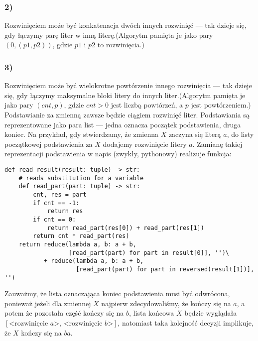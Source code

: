\documentclass[leqno, 12pt]{article}
\begin{document}
\subsubsection*{2)}
Rozwinięciem może być konkatenacja dwóch innych rozwinięć --- tak dzieje się, gdy łączymy parę liter w inną literę.\newline (Algorytm pamięta je jako pary $(0, (p1, p2))$, gdzie $p1$ i $p2$ to rozwinięcia.)

\subsubsection*{3)}
Rozwinięciem może być wielokrotne powtórzenie innego rozwinięcia --- tak dzieje się, gdy łączymy maksymalne bloki litery do innych liter.\newline (Algorytm pamięta je jako pary $(cnt, p)$, gdzie $cnt > 0$ jest liczbą powtórzeń, a $p$ jest powtórzeniem.)
\newline\newline\newline
Podstawianie za zmienną zawsze będzie ciągiem rozwinięć liter. Podstawiania są reprezentowane jako para list --- jedna oznacza początek podstawienia, druga koniec. Na przykład, gdy stwierdzamy, że zmienna $X$ zaczyna się literą $a$, do listy początkowej podstawienia za $X$ dodajemy rozwinięcie litery $a$.
\newline\newline
Zamianę takiej reprezentacji podstawienia w napis (zwykły, pythonowy) realizuje funkcja:
\begin{verbatim}
def read_result(result: tuple) -> str:
    # reads substitution for a variable
    def read_part(part: tuple) -> str:
        cnt, res = part
        if cnt == -1:
            return res
        if cnt == 0:
            return read_part(res[0]) + read_part(res[1])
        return cnt * read_part(res)
    return reduce(lambda a, b: a + b,
                  [read_part(part) for part in result[0]], '')\
           + reduce(lambda a, b: a + b,
                    [read_part(part) for part in reversed(result[1])], '')
\end{verbatim}
Zauważmy, że lista oznaczająca koniec podstawienia musi być odwrócona, ponieważ jeżeli dla zmiennej $X$ najpierw zdecydowaliśmy, że kończy się na $a$, a potem że pozostała część kończy się na $b$, lista końcowa $X$ będzie wyglądała \newline$[\text{<rozwinięcie }a\text{>, <rozwinięcie }b\text{>}]$, natomiast taka kolejność decyzji implikuje, że $X$ kończy się na $ba$.
\end{document}
